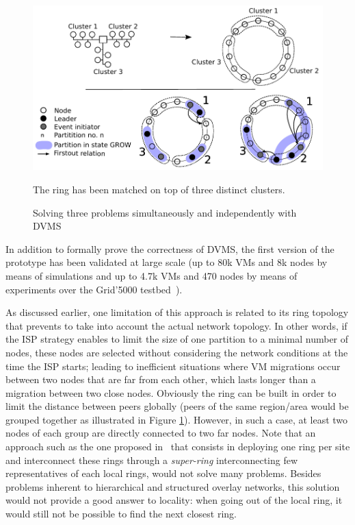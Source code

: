 \begin{figure}[h!]
  \centering
  \includegraphics[width=0.9\linewidth]{Figures/resourceAcquisition-standard.pdf}
  \caption{Solving three problems simultaneously and independently with DVMS}%
\small{The ring has been matched on top of three distinct clusters.}
  \label{fig:isp}%
\end{figure}

In addition to formally prove the correctness of DVMS, the first version of the prototype
has been validated at large scale (up to 80k VMs and 8k nodes by means of simulations and
up to 4.7k VMs and 470 nodes by means of experiments over the Grid'5000
testbed~\cite{quesnel:ispa2013}).

As discussed earlier, one limitation of this approach is related to its ring topology that
prevents to take into account the actual network topology.
%
%
%
In other words, if the ISP strategy enables to limit the size of one partition to a
minimal number of nodes, these nodes are selected without considering the network
conditions at the time the ISP starts; leading to inefficient situations where VM
migrations occur between two nodes that are far from each other, which lasts longer than a
migration between two close nodes. Obviously the ring can be built in order to limit the
distance between peers globally (\ie peers of the same region/area would be grouped
together as illustrated in Figure \ref{fig:isp}). However, in such a case, at least two
nodes of each group are directly connected to two far nodes.
%
Note that an approach such as the one proposed in~\cite{superchord} that consists in
deploying one ring per site and interconnect these rings through a \emph{super-ring}
interconnecting few representatives of each local rings, would not solve many
problems. Besides problems inherent to hierarchical and structured overlay networks, this
solution would not provide a good answer to locality: when going out of the local ring, it
would still not be possible to find the next closest ring.
%

